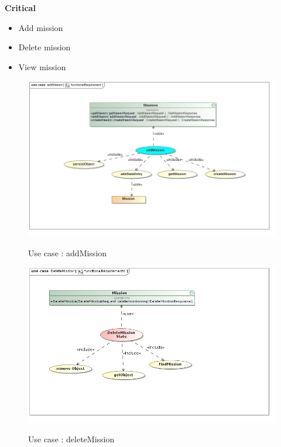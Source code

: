 \documentclass{article}
\begin{document}
		\begin{flushleft}
			\textbf{Critical}
				\begin{itemize}
	  				\item Add mission
	  				\item Delete mission
	  				\item View mission
				\end{itemize}
				
				\begin{figure}[H]
					\includegraphics[width=\textwidth]{functionalRequirement_addmission.jpg}  \\
					\caption{Use case : addMission}
				\end{figure}
				
				\begin{figure}[H]
					\includegraphics[width=\textwidth]{functionalRequirementsDeleteMission Use Case Diagram.jpg}  \\
					\caption{Use case : deleteMission}
				\end{figure}
				

\end{flushleft}
\end{document}

